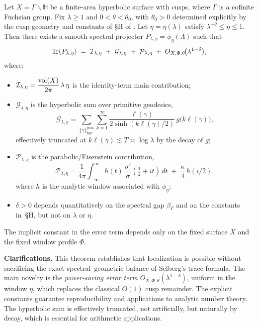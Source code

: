 \begin{theorem}\label{thm:intro-localized-trace}
Let $X=\Gamma\backslash\mathbb{H}$ be a finite-area hyperbolic surface with cusps, 
where $\Gamma$ is a cofinite Fuchsian group. 
Fix $\lambda\ge 1$ and $0<\theta<\theta_0$, with $\theta_0>0$ determined explicitly by the cusp geometry and constants of \S H of . 
Let $\eta=\eta(\lambda)$ satisfy $\lambda^{-\theta}\le \eta \le 1$. 
Then there exists a smooth spectral projector $P_{\lambda,\eta}=\phi_\eta(\Lambda)$ such that
\[
  \operatorname{Tr}(P_{\lambda,\eta})
  \;=\;
  \mathcal{I}_{\lambda,\eta}
  \;+\;
  \mathcal{G}_{\lambda,\eta}
  \;+\;
  \mathcal{P}_{\lambda,\eta}
  \;+\;
  O_{X,\Phi,\theta}\!\big(\lambda^{1-\delta}\big),
\]
where:
\begin{itemize}
  \item $\mathcal{I}_{\lambda,\eta} = \dfrac{\operatorname{vol}(X)}{2\pi}\,\lambda\,\eta$ is the identity-term main contribution;
  \item $\mathcal{G}_{\lambda,\eta}$ is the hyperbolic sum over primitive geodesics,
        \[
          \mathcal{G}_{\lambda,\eta}=\sum_{\{\gamma\}^{\mathrm{prim}}_{\mathrm{hyp}}}\sum_{k=1}^\infty
          \frac{\ell(\gamma)}{2\sinh(k\ell(\gamma)/2)}\,g\big(k\ell(\gamma)\big),
        \]
        effectively truncated at $k\ell(\gamma)\lesssim T\asymp \log\lambda$ by the decay of $g$;
  \item $\mathcal{P}_{\lambda,\eta}$ is the parabolic/Eisenstein contribution,
        \[
          \mathcal{P}_{\lambda,\eta}=\frac{1}{4\pi}\int_{-\infty}^\infty h(t)\,\frac{\sigma'}{\sigma}(\tfrac12+it)\,dt
          \;+\;\frac{\kappa}{4}\,h(i/2),
        \]
        where $h$ is the analytic window associated with $\phi_\eta$;
  \item $\delta>0$ depends quantitatively on the spectral gap $\beta_\Gamma$ and on the constants in~\S H, 
        but not on $\lambda$ or $\eta$.
\end{itemize}
The implicit constant in the error term depends only on the fixed surface $X$ and the fixed window profile $\Phi$.
\end{theorem}

\medskip

\noindent\textbf{Clarifications.}
This theorem establishes that localization is possible without sacrificing the exact spectral–geometric balance 
of Selberg’s trace formula. The main novelty is the \emph{power-saving error term} 
$O_{X,\Phi,\theta}(\lambda^{1-\delta})$, uniform in the window $\eta$, which replaces the classical $O(1)$ cusp remainder. 
The explicit constants guarantee reproducibility and applications to analytic number theory. 
The hyperbolic sum is effectively truncated, not artificially, but naturally by decay, which is essential for arithmetic applications. 


